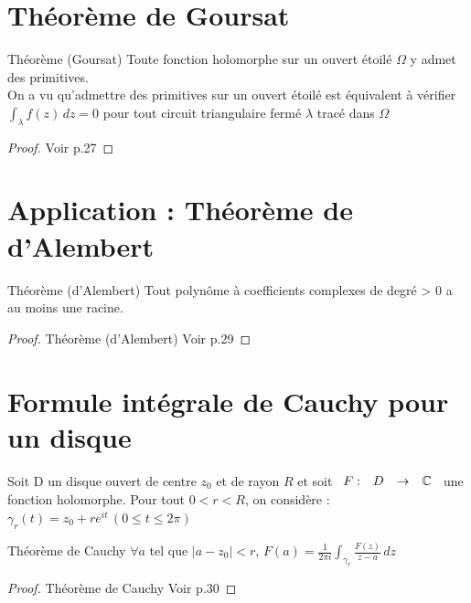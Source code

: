 \documentclass[]{report}
\begin{document}
\section{Théorème de Goursat}

\begin{tm}{Théorème (Goursat)}{}
    Toute fonction holomorphe sur un ouvert étoilé $\Omega$ y admet des primitives.\\
    On a vu qu'admettre des primitives sur un ouvert étoilé est équivalent à vérifier $\displaystyle{\int_\lambda f(z)\,dz=0}$ pour tout circuit triangulaire fermé $\lambda$ tracé dans $\Omega$
\end{tm}

\begin{proof}{}{}
    Voir p.27
\end{proof}

\section{Application : Théorème de d'Alembert}

\begin{tm}{Théorème (d'Alembert)}{}
    Tout polynôme à coefficients complexes de degré > 0 a au moins une racine.
\end{tm}

\begin{proof}{Théorème (d'Alembert)}{}
    Voir p.29
\end{proof}

\section{Formule intégrale de Cauchy pour un disque}

Soit D un disque ouvert de centre $z_0$ et de rayon $R$ et soit $\begin{array}{ccccc}
F : & D & \to & \mathbb{C}
\end{array}$ une fonction holomorphe. Pour tout $0<r<R$, on considère : $\gamma_r(t)=z_0+re^{it}\,(0\le t\le 2\pi)$

\begin{tm}{Théorème de Cauchy}{}
    $\forall a$ tel que $|a-z_0|<r$, $\displaystyle{F(a)=\frac{1}{2\pi i}\int_{\gamma_r} \frac{F(z)}{z-a}\,dz}$
\end{tm}

\begin{proof}{Théorème de Cauchy}{}
    Voir p.30
\end{proof}
\end{document}
